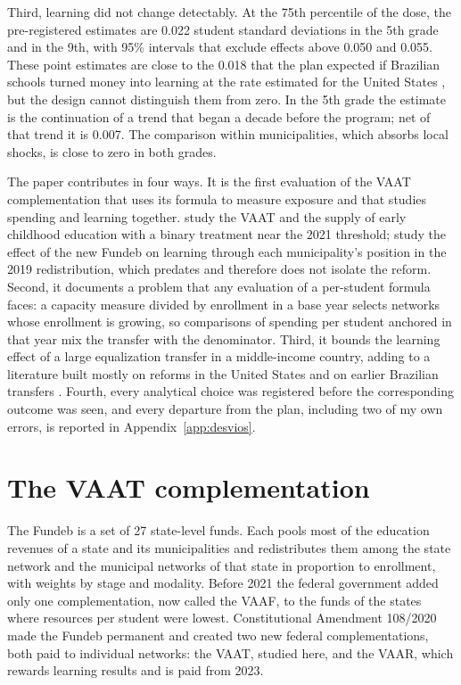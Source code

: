 \documentclass[11pt]{article}
\begin{document}
Third, learning did not change detectably. At the 75th percentile of the dose, the pre-registered estimates are 0.022 student standard deviations in the 5th grade and in the 9th, with 95\% intervals that exclude effects above 0.050 and 0.055. These point estimates are close to the 0.018 that the plan expected if Brazilian schools turned money into learning at the rate estimated for the United States \citep{jackson2024}, but the design cannot distinguish them from zero. In the 5th grade the estimate is the continuation of a trend that began a decade before the program; net of that trend it is 0.007. The comparison within municipalities, which absorbs local shocks, is close to zero in both grades.

The paper contributes in four ways. It is the first evaluation of the VAAT complementation that uses its formula to measure exposure and that studies spending and learning together. \citet{franca2026} study the VAAT and the supply of early childhood education with a binary treatment near the 2021 threshold; \citet{lima2025fundeb} study the effect of the new Fundeb on learning through each municipality's position in the 2019 redistribution, which predates and therefore does not isolate the reform. Second, it documents a problem that any evaluation of a per-student formula faces: a capacity measure divided by enrollment in a base year selects networks whose enrollment is growing, so comparisons of spending per student anchored in that year mix the transfer with the denominator. Third, it bounds the learning effect of a large equalization transfer in a middle-income country, adding to a literature built mostly on reforms in the United States \citep{jackson2016,lafortune2018,jackson2024} and on earlier Brazilian transfers \citep{menezes2007,litschig2013}. Fourth, every analytical choice was registered before the corresponding outcome was seen, and every departure from the plan, including two of my own errors, is reported in Appendix~\ref{app:desvios}.

\section{The VAAT complementation}\label{sec:politica}

The Fundeb is a set of 27 state-level funds. Each pools most of the education revenues of a state and its municipalities and redistributes them among the state network and the municipal networks of that state in proportion to enrollment, with weights by stage and modality. Before 2021 the federal government added only one complementation, now called the VAAF, to the funds of the states where resources per student were lowest. Constitutional Amendment 108/2020 made the Fundeb permanent and created two new federal complementations, both paid to individual networks: the VAAT, studied here, and the VAAR, which rewards learning results and is paid from 2023.
\end{document}
